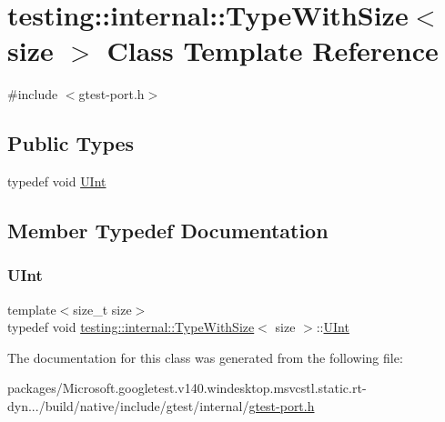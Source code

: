 \hypertarget{classtesting_1_1internal_1_1_type_with_size}{}\section{testing\+::internal\+::Type\+With\+Size$<$ size $>$ Class Template Reference}
\label{classtesting_1_1internal_1_1_type_with_size}


{\ttfamily \#include $<$gtest-\/port.\+h$>$}

\subsection*{Public Types}
\begin{DoxyCompactItemize}
\item 
typedef void \mbox{\hyperlink{classtesting_1_1internal_1_1_type_with_size_a3898640d9f6c1e18110eef90f47a5d7b}{U\+Int}}
\end{DoxyCompactItemize}


\subsection{Member Typedef Documentation}
\mbox{\label{classtesting_1_1internal_1_1_type_with_size_a3898640d9f6c1e18110eef90f47a5d7b}} 
\subsubsection{\texorpdfstring{UInt}{UInt}}
{\footnotesize\ttfamily template$<$size\+\_\+t size$>$ \\
typedef void \mbox{\hyperlink{classtesting_1_1internal_1_1_type_with_size}{testing\+::internal\+::\+Type\+With\+Size}}$<$ size $>$\+::\mbox{\hyperlink{classtesting_1_1internal_1_1_type_with_size_a3898640d9f6c1e18110eef90f47a5d7b}{U\+Int}}}



The documentation for this class was generated from the following file\+:\begin{DoxyCompactItemize}
\item 
packages/\+Microsoft.\+googletest.\+v140.\+windesktop.\+msvcstl.\+static.\+rt-\/dyn.../build/native/include/gtest/internal/\mbox{\hyperlink{gtest-port_8h}{gtest-\/port.\+h}}\end{DoxyCompactItemize}

